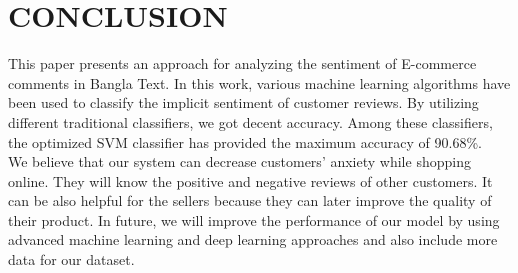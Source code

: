\documentclass[conference]{IEEEtran}
\begin{document}
\vspace{0.5cm}


\section{CONCLUSION}
This paper presents an approach for analyzing the sentiment of E-commerce comments in Bangla Text. In this work, various machine learning algorithms have been used to classify the implicit sentiment of customer reviews. By utilizing different traditional classifiers, we got decent accuracy. Among these classifiers, the optimized SVM classifier has provided the maximum accuracy of 90.68\%.
\\
We believe that our system can decrease customers' anxiety while shopping online. They will know the positive and negative reviews of other customers. It can be also helpful for the sellers because they can later improve the quality of their product.  In future, we will improve the performance of our model by using advanced machine learning and deep learning approaches and also include more data for our dataset.

\end{document}
